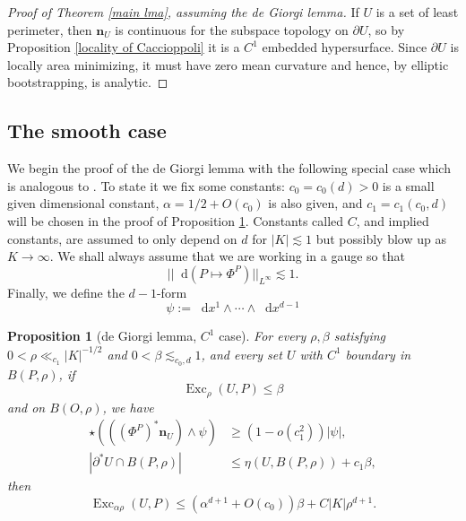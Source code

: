 \documentclass[reqno,10pt]{amsart}
\DeclareMathOperator{\Exc}{Exc}
\newcommand*\dif{\mathop{}\!\mathrm{d}}
\newcommand{\normal}{\mathbf n}
\newtheorem{proposition}[theorem]{Proposition}
\theoremstyle{definition}
\numberwithin{equation}{section}
\begin{document}
\begin{proof}[Proof of Theorem \ref{main lma}, assuming the de Giorgi lemma]
If $U$ is a set of least perimeter, then $\normal_U$ is continuous for the subspace topology on $\partial U$, so by Proposition \ref{locality of Caccioppoli} it is a $C^1$ embedded hypersurface.
Since $\partial U$ is locally area minimizing, it must have zero mean curvature and hence, by elliptic bootstrapping, is analytic.
\end{proof}


\subsection{The smooth case}
We begin the proof of the de Giorgi lemma with the following special case which is analogous to \cite[Lemma 6.4]{Giusti77}.
To state it we fix some constants: $c_0 = c_0(d) > 0$ is a small given dimensional constant, $\alpha = 1/2 + O(c_0)$ is also given, and $c_1 = c_1(c_0, d)$ will be chosen in the proof of Proposition \ref{Miranda44}.
Constants called $C$, and implied constants, are assumed to only depend on $d$ for $|K| \lesssim 1$ but possibly blow up as $K \to \infty$.
We shall always assume that we are working in a gauge so that
\begin{equation}\label{oscillation of isometries}
||\dif(P \mapsto \Phi^P)||_{L^\infty} \lesssim 1.
\end{equation}
Finally, we define the $d-1$-form
$$\psi := \dif x^1 \wedge \cdots \wedge \dif x^{d - 1}$$

\begin{proposition}[de Giorgi lemma, $C^1$ case]\label{Miranda44}
For every $\rho, \beta$ satisfying $0 < \rho \ll_{c_1} |K|^{-1/2}$ and $0 < \beta \lesssim_{c_0, d} 1$, and every set $U$ with $C^1$ boundary in $B(P, \rho)$, if
$$\Exc_\rho(U, P) \leq \beta$$
and on $B(O, \rho)$, we have
\begin{align}
\star(((\Phi^P)^* \normal_U) \wedge \psi) &\geq (1 - o(c_1^2)) |\psi|, \label{Miranda44 normal hyp} \\
|\partial^* U \cap B(P, \rho)| &\leq \eta(U, B(P, \rho)) + c_1 \beta, \label{Miranda44 minimality hyp}
\end{align}
then
\begin{equation}\label{Miranda44 concl}
\Exc_{\alpha \rho} (U, P) \leq (\alpha^{d + 1} + O(c_0)) \beta + C|K|\rho^{d + 1}.
\end{equation}
\end{proposition}
\end{document}
